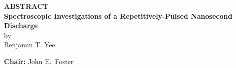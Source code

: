 \documentclass[12pt]{article}
\begin{document}
\pagestyle{empty}
\begin{center}
  \textbf{\large ABSTRACT} \\
  \vspace{2em}
  \textbf{Spectroscopic Investigations of a Repetitively-Pulsed
    Nanosecond Discharge} \\
  \vspace{1em}
  by \\
  \vspace{1em}
  Benjamin T. Yee
\end{center}
\vspace{1em}
\textbf{Chair:} John E.\ Foster
\vspace{2em}

  
\end{document}

